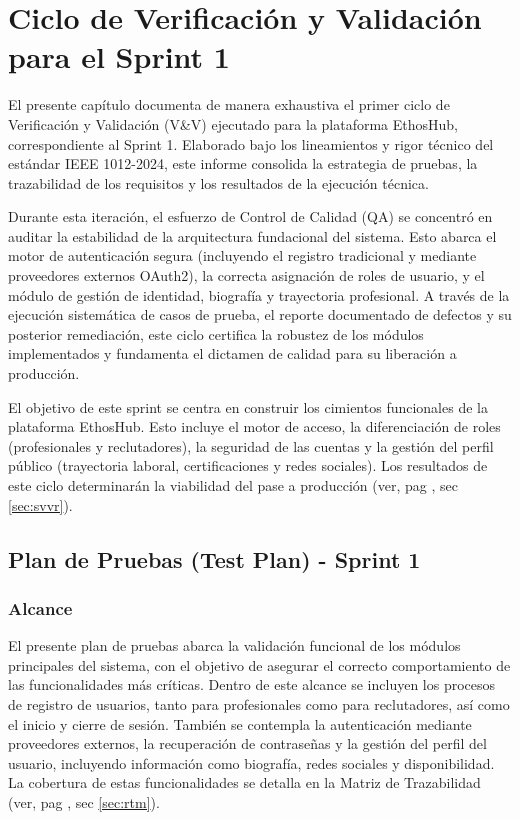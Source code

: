 
\chapter{Ciclo de Verificación y Validación para el Sprint 1}
\label{ch:sprint1}

El presente capítulo documenta de manera exhaustiva el primer ciclo de Verificación y Validación (V\&V) ejecutado para la plataforma EthosHub, correspondiente al Sprint 1. Elaborado bajo los lineamientos y rigor técnico del estándar IEEE 1012-2024, este informe consolida la estrategia de pruebas, la trazabilidad de los requisitos y los resultados de la ejecución técnica.\par
Durante esta iteración, el esfuerzo de Control de Calidad (QA) se concentró en auditar la estabilidad de la arquitectura fundacional del sistema. Esto abarca el motor de autenticación segura (incluyendo el registro tradicional y mediante proveedores externos OAuth2), la correcta asignación de roles de usuario, y el módulo de gestión de identidad, biografía y trayectoria profesional. A través de la ejecución sistemática de casos de prueba, el reporte documentado de defectos y su posterior remediación, este ciclo certifica la robustez de los módulos implementados y fundamenta el dictamen de calidad para su liberación a producción.

\newpage
\begin{NotaTecnica}
El objetivo de este sprint se centra en construir los cimientos funcionales de la plataforma EthosHub. Esto incluye el motor de acceso, la diferenciación de roles (profesionales y reclutadores), la seguridad de las cuentas y la gestión del perfil público (trayectoria laboral, certificaciones y redes sociales). Los resultados de este ciclo determinarán la viabilidad del pase a producción (ver, pag \pageref{sec:svvr}, sec \ref{sec:svvr}).
\end{NotaTecnica}

\section{Plan de Pruebas (Test Plan) - Sprint 1}
\label{sec:plan_pruebas}

\subsection{Alcance}
El presente plan de pruebas abarca la validación funcional de los módulos principales del sistema, con el objetivo de asegurar el correcto comportamiento de las funcionalidades más críticas. Dentro de este alcance se incluyen los procesos de registro de usuarios, tanto para profesionales como para reclutadores, así como el inicio y cierre de sesión. También se contempla la autenticación mediante proveedores externos, la recuperación de contraseñas y la gestión del perfil del usuario, incluyendo información como biografía, redes sociales y disponibilidad. La cobertura de estas funcionalidades se detalla en la Matriz de Trazabilidad (ver, pag \pageref{sec:rtm}, sec \ref{sec:rtm}).

